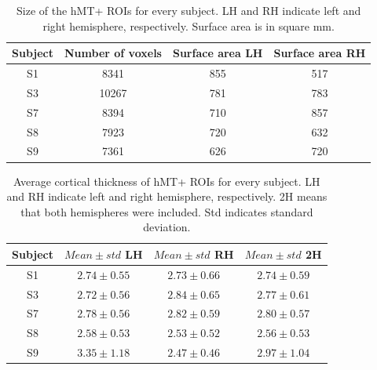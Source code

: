 \begin{table}[htbp!]
\centering
\caption{Size of the hMT+ ROIs for every subject. LH and RH indicate left and right hemisphere, respectively. Surface area is in square mm.}
\begin{tabular}{cccc}
\\
\toprule
Subject & Number of voxels & Surface area LH & Surface area RH
\\
\midrule
S1 & 8341 & 855 & 517\\
S3 & 10267 & 781 & 783\\
S7 & 8394 & 710 & 857\\
S8 & 7923 & 720 & 632\\
S9 & 7361 & 626 & 720\\
\bottomrule
\end{tabular}
\label{tab:rois}
\end{table}

\begin{table}[htbp!]
\centering
\caption{Average cortical thickness of hMT+ ROIs for every subject. LH and RH indicate left and right hemisphere, respectively. 2H means that both hemispheres were included. Std indicates standard deviation.}
\begin{tabular}{cccc}
\\
\toprule
Subject & $Mean\pm std$ LH & $Mean\pm std$ RH & $Mean\pm std$ 2H 
\\
\midrule
S1 & $2.74\pm0.55$ &  $2.73\pm0.66$ &  $2.74\pm0.59$\\
S3 & $2.72\pm0.56$ &  $2.84\pm0.65$ &  $2.77\pm0.61$\\
S7 & $2.78\pm0.56$ &  $2.82\pm0.59$ &  $2.80\pm0.57$\\
S8 & $2.58\pm0.53$ &  $2.53\pm0.52$ &  $2.56\pm0.53$\\
S9 & $3.35\pm1.18$ &  $2.47\pm0.46$ &  $2.97\pm1.04$\\
\bottomrule
\end{tabular}
\label{tab:thickness}
\end{table}

